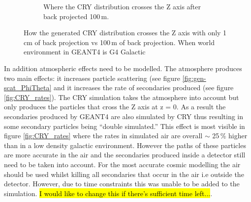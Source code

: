 \begin{figure}[htbp]
\begin{subfigure}{.5\textwidth}
  \captionsetup{width=.9\linewidth}
  \caption{Where the CRY distribution crosses the Z axis after back projected 100\,m.}
  \label{subFig:Crossed_atZ_XY}
\end{subfigure}
\caption{How the generated CRY distribution crosses the Z axis with only 1\,cm of back projection vs 100\,m of back projection. When world environment in GEANT4 is G4 Galactic}
\label{fig:Crossed_atZ_XY_AndShort}
\end{figure}

In addition atmospheric effects need to be modelled. The atmosphere produces two main effects: it increases particle scattering (see figure \ref{fig:gen-scat_PhiTheta} and it increases the rate of secondaries produced (see figure \ref{fig:CRY_rates}). The CRY simulation takes the atmosphere into account \cite{hagmann2007monteCry} but only produces the particles that cross the Z axis at z = 0. As a result the secondaries produced by GEANT4 are also simulated by CRY thus resulting in some secondary particles being ``double simulated.'' This effect is most visible in figure \ref{fig:CRY_rates} where the rates in simulated air are overall $\sim$ 25\,\% higher than in a low density galactic environment. However the paths of these particles are more accurate in the air and the secondaries produced inside a detector still need to be taken into account. For the most accurate cosmic modelling the air should be used whilst killing all secondaries that occur in the air i.e outside the detector. However, due to time constraints this was unable to be added to the simulation. \hl{I would like to change this if there's sufficient time left...}.

